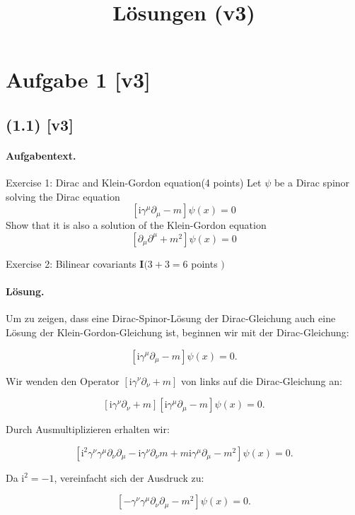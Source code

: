 \documentclass[11pt,a4paper]{article}
\title{Lösungen (v3)}
\date{}
\begin{document}
\maketitle

\section*{Aufgabe 1 [v3]}
\subsection*{(1.1) [v3]}
\paragraph{Aufgabentext.}
Exercise 1: Dirac and Klein-Gordon equation(4 points)
Let $\psi$ be a Dirac spinor solving the Dirac equation
$$
\left[\mathrm{i} \gamma^\mu \partial_\mu-m\right] \psi(x)=0
$$
Show that it is also a solution of the Klein-Gordon equation
$$
\left[\partial_\mu \partial^\mu+m^2\right] \psi(x)=0
$$



Exercise 2: Bilinear covariants $\mathbf{I}(3+3=6$ points $)$

\paragraph{Lösung.}
Um zu zeigen, dass eine Dirac-Spinor-Lösung der Dirac-Gleichung auch eine Lösung der Klein-Gordon-Gleichung ist, beginnen wir mit der Dirac-Gleichung:

\[
\left[\mathrm{i} \gamma^\mu \partial_\mu - m\right] \psi(x) = 0.
\]

Wir wenden den Operator \(\left[\mathrm{i} \gamma^\nu \partial_\nu + m\right]\) von links auf die Dirac-Gleichung an:

\[
\left[\mathrm{i} \gamma^\nu \partial_\nu + m\right] \left[\mathrm{i} \gamma^\mu \partial_\mu - m\right] \psi(x) = 0.
\]

Durch Ausmultiplizieren erhalten wir:

\[
\left[\mathrm{i}^2 \gamma^\nu \gamma^\mu \partial_\nu \partial_\mu - \mathrm{i} \gamma^\nu \partial_\nu m + m \mathrm{i} \gamma^\mu \partial_\mu - m^2\right] \psi(x) = 0.
\]

Da \(\mathrm{i}^2 = -1\), vereinfacht sich der Ausdruck zu:

\[
\left[-\gamma^\nu \gamma^\mu \partial_\nu \partial_\mu - m^2\right] \psi(x) = 0.
\]
\end{document}
